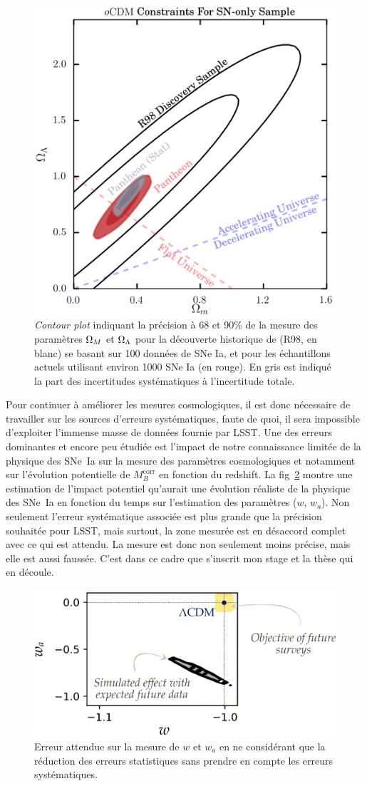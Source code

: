 \documentclass[a4paper, 12pt, svgnames]{article}
\begin{document}
\begin{figure}[htbp!]
    \centering
    \includegraphics[width=.5\linewidth]{Rapport_figures/scolnic_syst.png}
    \captionsetup{justification=centering}
    \caption{\textit{Contour plot} indiquant la précision à 68 et 90\% de la
    mesure des paramètres $\Omega_M$ et $\Omega_\Lambda$ pour la découverte historique de
     (R98, en blanc) se basant sur 100 données de SNe Ia, et
    pour les échantillons actuels utilisant environ 1000 SNe Ia (en rouge). En
    gris est indiqué la part des incertitudes systématiques à l'incertitude
    totale. \cite{scolnic_complete_2018}}
    \label{scolnic_syst}
\end{figure}

Pour continuer à améliorer les mesures cosmologiques, il est donc nécessaire de
travailler sur les sources d'erreurs systématiques, faute de quoi, il sera
impossible d'exploiter l'immense masse de données fournie par LSST. Une des
erreurs dominantes et encore peu étudiée est l'impact de notre connaissance
limitée de la physique des SNe~Ia sur la mesure des paramètres cosmologiques
\cite{rigault_strong_2018} et notamment sur l'évolution potentielle de
$M_B^{\mathrm{corr}}$ en fonction du redshift. La fig~\ref{err_syst} montre une
estimation de l'impact potentiel qu'aurait une évolution réaliste de la physique
des SNe~Ia en fonction du temps sur l'estimation des paramètres ($w$, $w_a$).
Non seulement l'erreur systématique associée est plus grande que la précision
souhaitée pour LSST, mais surtout, la zone mesurée est en désaccord complet avec
ce qui est attendu. La mesure est donc non seulement moins précise, mais elle
est aussi faussée. C'est dans ce cadre que s'inscrit mon stage et la thèse qui
en découle.

\begin{figure}[htbp!]
    \centering
    \includegraphics[width=.5\linewidth]{Rapport_figures/error.PNG}
    \captionsetup{justification=centering}
    \caption{Erreur attendue sur la mesure de $w$ et $w_a$ en ne considérant
    que la réduction des erreurs statistiques sans prendre en compte les erreurs
    systématiques.}
    \label{err_syst}
\end{figure}
\end{document}

